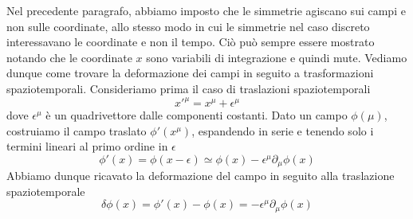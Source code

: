     Nel precedente paragrafo, abbiamo imposto che le simmetrie agiscano sui campi e non sulle coordinate, allo stesso modo in cui le simmetrie nel caso discreto interessavano le coordinate e non il tempo. Ciò può sempre essere mostrato notando che le coordinate $x$ sono variabili di integrazione e quindi mute. Vediamo dunque come trovare la deformazione dei campi in seguito a trasformazioni spaziotemporali. Consideriamo prima il caso di traslazioni spaziotemporali
    \begin{equation*}
        x'^\mu = x^\mu + \epsilon^\mu
    \end{equation*} 
        dove $\epsilon^\mu$ è un quadrivettore dalle componenti costanti. Dato un campo $\phi(\mu)$, costruiamo il campo traslato $\phi'(x^\mu)$, espandendo in serie e tenendo solo i termini lineari al primo ordine in $\epsilon$
    \begin{equation*}
        \phi'(x) = \phi(x - \epsilon) \simeq \phi(x) - \epsilon^\mu \partial_\mu \phi(x)
    \end{equation*}
        Abbiamo dunque ricavato la deformazione del campo in seguito alla traslazione spaziotemporale 
    \begin{equation*}
        \delta \phi(x) = \phi'(x) - \phi(x) = -\epsilon^\mu \partial_\mu \phi (x)
    \end{equation*}

